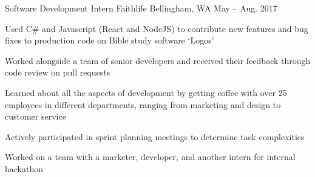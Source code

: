 

\begin{cventries}

  \cventry
    {Software Development Intern} %
    {Faithlife} %
    {Bellingham, WA} %
    {May – Aug. 2017} %
    {
      \begin{cvitems} %
        \item {Used C\# and Javascript (React and NodeJS) to contribute new features and bug fixes to production code on Bible study software `Logos'}
        \item {Worked alongside a team of senior developers and received their feedback through code review on pull requests}
        \item {Learned about all the aspects of development by getting coffee with over 25 employees in different departments, ranging from marketing and design to customer service}
        \item {Actively participated in sprint planning meetings to determine task complexities}
        \item {Worked on a team with a marketer, developer, and another intern for internal hackathon}
      \end{cvitems}
    }

\end{cventries}
